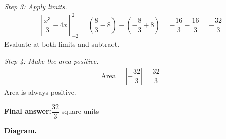 \documentclass[11pt]{article}
\begin{document}
\textit{Step 3: Apply limits.}
\[\begin{gathered}
\left[\dfrac{x^3}{3} - 4x\right]_{-2}^{2} = \left(\dfrac{8}{3} - 8\right) - \left(-\dfrac{8}{3} + 8\right) = -\dfrac{16}{3} - \dfrac{16}{3} = -\dfrac{32}{3}
\end{gathered}\]
Evaluate at both limits and subtract.

\textit{Step 4: Make the area positive.}
\[\begin{gathered}
\text{Area} = \left|-\dfrac{32}{3}\right| = \dfrac{32}{3}
\end{gathered}\]
Area is always positive.

\begin{answerbox}
\textbf{Final answer:}\quad \(\displaystyle \dfrac{32}{3}\) square units
\end{answerbox}
\textbf{Diagram.}
\end{document}
